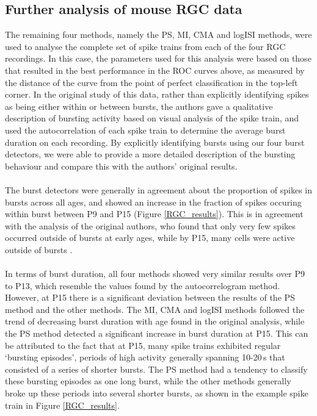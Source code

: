 \documentclass[12pt, titlepage]{article}
\begin{document}
	\subsection*{Further analysis of mouse RGC data}
	The remaining four methods, namely the PS, MI, CMA and logISI methods, were used to analyse the complete set of spike trains from each of the four RGC recordings. In this case, the parameters used for this analysis were based on those that resulted in the best performance in the ROC curves above, as measured by the distance of the curve from the point of perfect classification in the top-left corner. In the original study of this data, rather than explicitly identifying spikes as being either within or between bursts, the authors gave a qualitative description of bursting activity based on visual analysis of the spike train, and used the autocorrelation of each spike train to determine the average burst duration on each recording. By explicitly identifying bursts using our four burst detectors, we were able to provide a more detailed description of the bursting behaviour and compare this with the authors' original results.
	\\ \\ The burst detectors were generally in agreement about the proportion of spikes in bursts across all ages, and showed an increase in the fraction of spikes occuring within burst between P9 and P15 (Figure \ref{RGC_results}). This is in agreement with the analysis of the original authors, who found that only very few spikes occurred outside of bursts at early ages, while by P15, many cells were active outside of bursts \cite{Demas2003}.
	\\ \\In terms of burst duration, all four methods showed very similar results over P9 to P13, which resemble the values found by the autocorrelogram method. However, at P15 there is a significant deviation between the results of the PS method and the other methods. The MI, CMA and logISI methods followed the trend of decreasing burst duration with age found in the original analysis, while the PS method detected a significant increase in burst duration at P15. This can be attributed to the fact that at P15, many spike trains exhibited regular `bursting episodes', periods of high activity generally spanning 10-20$\,$s that consisted of a series of shorter bursts. The PS method had a tendency to classify these bursting episodes as one long burst, while the other methods generally broke up these periods into several shorter bursts, as shown in the example spike train in Figure \ref{RGC_results}. 
\end{document}
